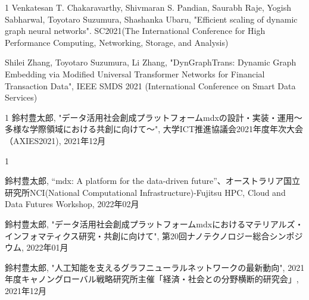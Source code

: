 

% 

\begin{査読付}{1}
Venkatesan T. Chakaravarthy, Shivmaran S. Pandian, Saurabh Raje, Yogish Sabharwal, Toyotaro Suzumura, Shashanka Ubaru, 
"Efficient scaling of dynamic graph neural networks". SC2021(The International Conference for High Performance Computing, Networking, Storage, and Analysis)

Shilei Zhang, Toyotaro Suzumura, Li Zhang, "DynGraphTrans: Dynamic Graph Embedding via Modified Universal Transformer Networks for Financial Transaction Data", IEEE SMDS 2021 (International Conference on Smart Data Services) 
\end{査読付}

\begin{発表}{1}
鈴村豊太郎, "データ活用社会創成プラットフォームmdxの設計・実装・運用〜多様な学際領域における共創に向けて～", 大学ICT推進協議会2021年度年次大会（AXIES2021), 2021年12月
\end{発表}

\begin{招待講演}{1}


鈴村豊太郎, “mdx: A platform for the data-driven future”、オーストラリア国立研究所NCI(National Computational Infrastructure)-Fujitsu HPC, Cloud and Data Futures Workshop, 2022年02月

鈴村豊太郎, "データ活用社会創成プラットフォームmdxにおけるマテリアルズ・インフォマティクス研究・共創に向けて", 第20回ナノテクノロジー総合シンポジウム, 2022年01月

鈴村豊太郎, "人工知能を支えるグラフニューラルネットワークの最新動向", 2021年度キャノングローバル戦略研究所主催「経済・社会との分野横断的研究会」, 2021年12月


\end{招待講演}


